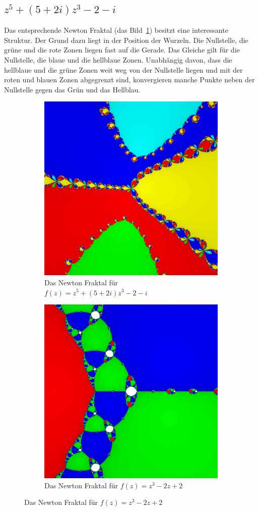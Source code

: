 \documentclass[a4paper,12pt]{llncs}
\numberwithin{equation}{section}
\begin{document}
\subsection{$z^5 + (5+2i)z^3 - 2-i $}
Das entsprechende Newton Fraktal (das Bild~\ref{fig:output_f7}) besitzt eine interessante Struktur. 
Der Grund dazu liegt in der Position der Wurzeln.
Die Nullstelle, die grüne und die rote Zonen liegen fast auf die Gerade.
Das Gleiche gilt für die Nullstelle, die blaue und die hellblaue Zonen.
Unabhängig davon, dass die hellblaue und die grüne Zonen weit weg von der Nullstelle liegen und mit der roten und blauen Zonen abgegrenzt sind, konvergieren manche Punkte neben der Nullstelle gegen das Grün und das Hellblau.
\begin{figure}[ht]   
	\begin{subfigure}{.5\textwidth}
		\centering
		\includegraphics[width=.7\linewidth]{figures/output_f7}
		\captionsetup{width=0.8\textwidth}
		\caption{Das Newton Fraktal für $f(z)=z^5 + (5+2i)z^3 - 2-i $ }
		\label{fig:output_f7}
	\end{subfigure}%
	\begin{subfigure}{.5\textwidth}
		\centering
		\includegraphics[width=.7\linewidth]{figures/output_f5}
		\captionsetup{width=0.8\textwidth}
		\caption{Das Newton Fraktal für $f(z)=z^3 - 2z + 2$ }
		\label{fig:output_f5}

	\end{subfigure}%
\end{figure}
\end{document}
